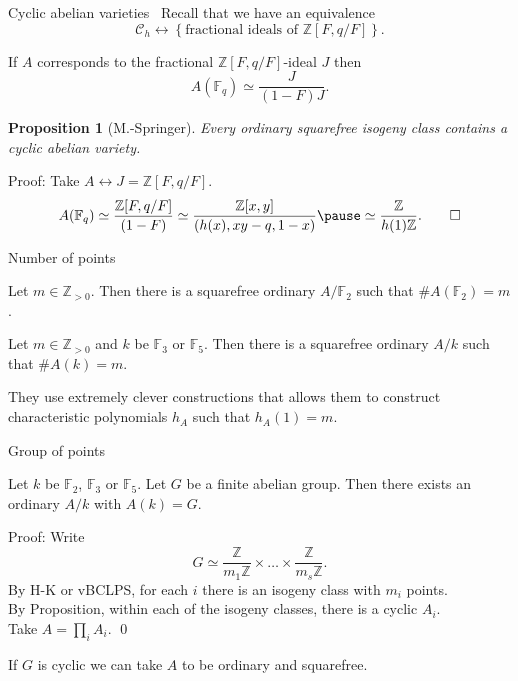 \documentclass[usenames,dvipsnames]{beamer}
\def\Z{\mathbb{Z}}
\def\F{\mathbb{F}}
\newcommand{\cC}{{\mathcal C}}
\newcommand{\set}[1]{\left\lbrace#1\right\rbrace }
\newtheorem{prop}[df]{Proposition}
\begin{document}
\begin{frame}{ Cyclic abelian varieties }\
    Recall that we have an equivalence
    \[ \cC_h \longleftrightarrow \set{\text{fractional ideals of $\Z[F,q/F]$}}. \]
    \pause
    \vspace{-0.5cm}
    \begin{corollary}
        If $A$ corresponds to the fractional $\Z[F,q/F]$-ideal $J$ then
    \pause
        \vspace{-0.2cm}
        \[ A(\F_q) \simeq \frac{J}{(1-F)J}.\]
    \end{corollary}
    \pause
    \begin{prop}[M.-Springer]
        Every ordinary squarefree isogeny class contains a cyclic abelian variety.
    \end{prop}
    \pause
	Proof: Take $A\longleftrightarrow J=\Z[F,q/F]$.
    \pause
    \[ A(\F_q)\simeq \frac{\Z[F,q/F]}{(1-F)} \simeq \frac{\Z[x,y]}{(h(x),xy-q,1-x)}
    \pause
    \simeq \frac{\Z}{h(1)\Z}.\qed \]
\end{frame}

\begin{frame}{ Number of points }
    \begin{theorem}
        Let $m\in\Z_{> 0}$. Then there is a squarefree ordinary $A/\F_2$ such that $\#A(\F_2)=m$.
    \end{theorem}
    \pause
    \begin{theorem}
        Let $m\in\Z_{> 0}$ and $k$ be $\F_3$ or $\F_5$. Then there is a squarefree ordinary $A/k$ such that $\#A(k)=m$.
    \end{theorem}
    \pause
    They use extremely clever constructions that allows them to construct characteristic polynomials $h_A$ such that $h_A(1)=m$.
\end{frame}

\begin{frame}{ Group of points }
    \begin{theorem}[M.-Springer]
        Let $k$ be $\F_2$, $\F_3$ or $\F_5$. Let $G$ be a finite abelian group.
        \pause
        Then there exists an ordinary $A/k$ with $A(k) = G$.
    \end{theorem}
    \pause
    Proof: Write
    \[ G\simeq \frac{\Z}{m_1 \Z} \times \ldots \times \frac{\Z}{m_s \Z}.\]
    \pause
    By H-K or vBCLPS, for each $i$ there is an isogeny class with $m_i$ points.\\
    \pause
    By Proposition, within each of the isogeny classes, there is a cyclic $A_i$.\\
    \pause
    Take $A=\prod_i A_i$. \qed
    \pause
    \begin{corollary}
        If $G$ is cyclic we can take $A$ to be ordinary and squarefree.
    \end{corollary}
\end{frame}
\end{document}

